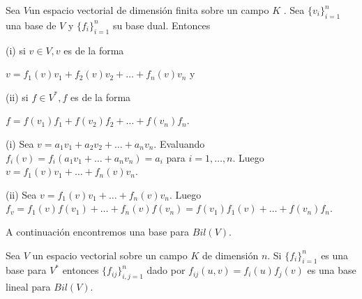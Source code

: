 		\begin{pro}
			\normalfont
			Sea $ V  $un espacio vectorial de dimensión finita sobre un campo $ K $ . Sea $ \{v_{i}\}^{n}_{i=1} $ una base de $ V $ y $ \{f_{i}\}^{n}_{i=1} $ su base dual. Entonces 
			
			(i) si $ v \in V, v $ es de la forma 
			\begin{center}
				$ v = f_{1}(v)v_{1}+f_{2}(v)v_{2}+\ldots+f_{n}(v)v_{n} $ y
			\end{center}
			(ii) si $ f \in V^{*}, f $ es de la forma 
			\begin{center}
				$ f = f(v_{1})f_{1}+f(v_{2})f_{2}+\ldots+f(v_{n})f_{n} $.
			\end{center}
		\end{pro}
		\begin{demo}
			\normalfont
			(i) Sea $ v = a_{1}v_{1}+a_{2}v_{2}+\ldots+a_{n}v_{n} $. Evaluando $ f_{i}(v) = f_{i}(a_{1}v_{1}+\ldots+a_{n}v_{n}) = a_{i}$ para $ i = 1,\ldots,n $. Luego $ v = f_{1}(v)v_{1}+\ldots+f_{n}(v)v_{n} $.
			
			(ii) Sea $ v = f_{1}(v)v_{1}+\ldots+f_{n}(v)v_{n} $. Luego $ f_{v} = f_{1}(v)f(v_{1})+\ldots+f_{n}(v)f(v_{n}) = f(v_{1})f_{1}(v)+\ldots+f(v_{n})f_{n} $.
			
			A continuación encontremos una base para $ Bil(V) $.
		\end{demo}
		\begin{pro}
			\normalfont 
			Sea $ V $ un espacio vectorial sobre un campo $ K $ de
			dimensión $ n $. Si $ \{f_{i}\}^{n}_{i=1} $ es una base para $ V^{*} $ entonces $ \{f_{ij}\}^{n}_{i,j=1} $ dado por $ f_{ij}(u,v) = f_{i}(u)f_{j}(v)$ es una base lineal para $ Bil(V) $.
		\end{pro}
	